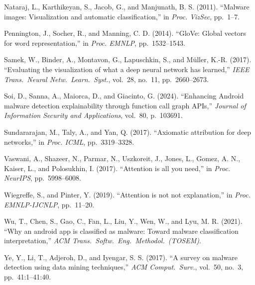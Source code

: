 \documentclass[12pt]{article}
\begin{document}
\begin{thebibliography}{}
Nataraj, L., Karthikeyan, S., Jacob, G., and Manjunath, B. S. (2011).
``Malware images: Visualization and automatic classification,''
in \textit{Proc. VizSec}, pp.\ 1--7.

Pennington, J., Socher, R., and Manning, C. D. (2014).
``GloVe: Global vectors for word representation,''
in \textit{Proc. EMNLP}, pp.\ 1532--1543.

Samek, W., Binder, A., Montavon, G., Lapuschkin, S., and M\"{u}ller, K.-R. (2017).
``Evaluating the visualization of what a deep neural network has learned,''
\textit{IEEE Trans.\ Neural Netw.\ Learn.\ Syst.}, vol.\ 28, no.\ 11, pp.\ 2660--2673.

Soi, D., Sanna, A., Maiorca, D., and Giacinto, G. (2024).
``Enhancing Android malware detection explainability through function call graph APIs,''
\textit{Journal of Information Security and Applications}, vol.\ 80, p.\ 103691.

Sundararajan, M., Taly, A., and Yan, Q. (2017).
``Axiomatic attribution for deep networks,''
in \textit{Proc. ICML}, pp.\ 3319--3328.

Vaswani, A., Shazeer, N., Parmar, N., Uszkoreit, J., Jones, L., Gomez, A. N., Kaiser, L., and Polosukhin, I. (2017).
``Attention is all you need,''
in \textit{Proc. NeurIPS}, pp.\ 5998--6008.

Wiegreffe, S., and Pinter, Y. (2019).
``Attention is not not explanation,''
in \textit{Proc. EMNLP-IJCNLP}, pp.\ 11--20.

Wu, T., Chen, S., Gao, C., Fan, L., Liu, Y., Wen, W., and Lyu, M. R. (2021).
``Why an android app is classified as malware: Toward malware classification interpretation,''
\textit{ACM Trans.\ Softw.\ Eng.\ Methodol.\ (TOSEM)}.

Ye, Y., Li, T., Adjeroh, D., and Iyengar, S. S. (2017).
``A survey on malware detection using data mining techniques,''
\textit{ACM Comput.\ Surv.}, vol.\ 50, no.\ 3, pp.\ 41:1--41:40.

\end{thebibliography}
\end{document}
